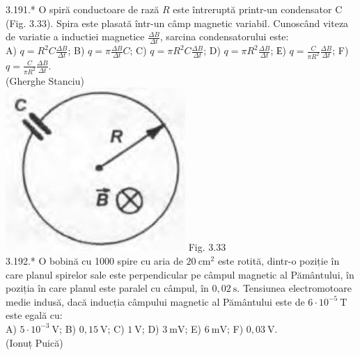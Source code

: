 \documentclass[10pt]{article}
\begin{document}
3.191.* O spiră conductoare de rază $R$ este întreruptă printr-un condensator C (Fig. 3.33). Spira este plasată într-un câmp magnetic variabil. Cunoscând viteza de variatie a inductiei magnetice $\frac{\Delta B}{\Delta t}$, sarcina condensatorului este:\\ A) $q=R^{2} C \frac{\Delta B}{\Delta t}$; B) $q=\pi \frac{\Delta B}{\Delta t} C$; C) $q=\pi R^{2} C \frac{\Delta B}{\Delta t}$; D) $q=\pi R^{2} \frac{\Delta B}{\Delta t}$; Е) $q=\frac{C}{\pi R^{2}} \frac{\Delta B}{\Delta t}$; F) $q=\frac{C}{\pi R^{2}} \frac{\Delta B}{\Delta t}$.\\ (Gherghe Stanciu)\\ \includegraphics[max width=\textwidth, center]{2025_07_01_5b3ff9fa0d508c8e9f17g-188} Fig. 3.33\\

3.192.* O bobină cu 1000 spire cu aria de $20 \mathrm{~cm}^{2}$ este rotită, dintr-o poziție în care planul spirelor sale este perpendicular pe câmpul magnetic al Pământului, în poziția în care planul este paralel cu câmpul, în $0,02 \mathrm{~s}$. Tensiunea electromotoare medie indusă, dacă inducția câmpului magnetic al Pământului este de $6 \cdot 10^{-5} \mathrm{~T}$ este egală cu:\\ A) $5 \cdot 10^{-3} \mathrm{~V}$; B) $0,15 \mathrm{~V}$; C) $1 \mathrm{~V}$; D) $3 \mathrm{~mV}$; E) $6 \mathrm{~mV}$; F) $0,03 \mathrm{~V}$.\\ (Ionuț Puică)\\
\end{document}
